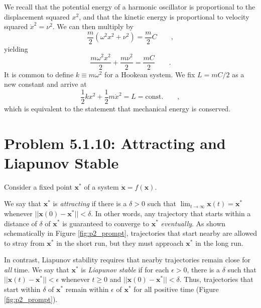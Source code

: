 \documentclass[draft]{agujournal2019}
\begin{document}
We recall that the potential energy of a harmonic oscillator is proportional to the displacement squared $x^2$, and that the kinetic energy is proportional to velocity squared $\dot x^2 = \nu^2$. We can then multiply by 
\begin{equation*}
    \frac{m}{2} (\omega^2 x^2 + \nu^2) = \frac{m}{2} C \qquad ,
\end{equation*}
yielding 
\begin{equation*}
    \frac{m \omega^2 x^2}{2} + \frac{m \nu^2}{2} = \frac{mC}{2} \qquad .
\end{equation*}
It is common to define $k\equiv m\omega^2$ for a Hookean system. We fix $L = mC/2$ as a new constant and arrive at 
\begin{equation*}
    \frac{1}{2} k x^2 + \frac{1}{2} m \dot x^2 = L = \mathrm{const.} \qquad ,
\end{equation*}
which is equivalent to the statement that mechanical energy is conserved. 







\section{Problem 5.1.10: Attracting and Liapunov Stable}
\label{sec:p2}

Consider a fixed point $\mathbf{x}^*$ of a system $\mathbf{\dot x} = f(\mathbf{x})$. 
\par
We say that $\mathbf{x}^*$ is \emph{attracting} if there is a $\delta>0$ such that $\lim_{t \longrightarrow \infty}\mathbf{x}(t)=\mathbf{x}^*$ whenever $||\mathbf{x}(0)-\mathbf{x}^*||<\delta$. In other words, any trajectory that starts within a distance of $\delta$ of $\mathbf{x}^*$ is guaranteed to converge to $\mathbf{x}^*$ \emph{eventually}. As shown schematically in Figure \ref{fig:p2_prompt}, trajectories that start nearby are allowed to stray from $\mathbf{x}^*$ in the short run, but they must approach $\mathbf{x}^*$ in the long run. 
\par

In contrast, Liapunov stability requires that nearby trajectories remain close for \emph{all} time. We say that $\mathbf{x}^*$ is \emph{Liapunov stable} if for each $\epsilon>0$, there is a $\delta$ such that $||\mathbf{x}(t) - \mathbf{x}^*||<\epsilon$ whenever $t\geq 0$ and $||\mathbf{x}(0) - \mathbf{x}^*||<\delta$. Thus, trajectories that start within $\delta$ of $\mathbf{x}^*$ remain within $\epsilon$ of $\mathbf{x}^*$ for all positive time (Figure \ref{fig:p2_prompt}).
\par
\end{document}
